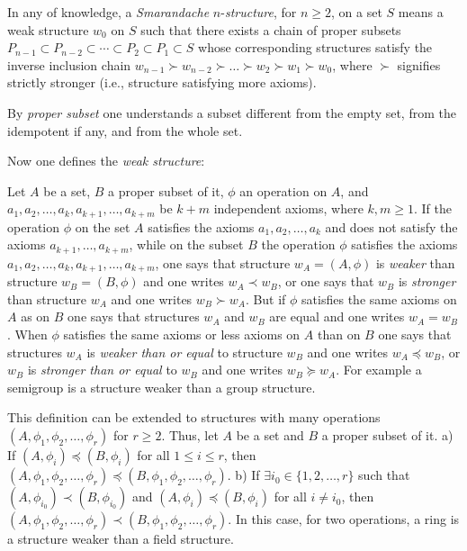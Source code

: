 \documentclass[12pt]{article}
\begin{document}
In any  of knowledge, a \emph{Smarandache} $n$-\emph{structure}, for $n \geqslant 2$, on a set $S$ means a weak structure $w_0$ on $S$ such that there exists a chain of proper subsets $P_{n-1} \subset P_{n-2} \subset \cdots \subset  P_2 \subset P_1 \subset  S$ whose corresponding structures satisfy the inverse inclusion chain $w_{n-1} \succ w_{n-2} \succ \dots \succ w_2 \succ w_1 \succ w_0$, where $\succ$ signifies strictly stronger (i.e., structure satisfying more axioms). 

By \emph{proper subset}  one understands a subset different from the empty set, from the idempotent if any, and from the whole set.

Now one defines the \emph{weak structure}:

Let $A$ be a set, $B$ a proper subset of it, $\phi$ an operation on $A$, and $a_1, a_2, \ldots, a_k, a_{k+1}, \ldots, a_{k+m}$ be $k+m$ independent axioms, where $k, m \geqslant 1$. 
\newline If the operation $\phi$ on the set $A$ satisfies the axioms $a_1, a_2, \ldots, a_k$ and does not satisfy the axioms $a_{k+1}, \ldots, a_{k+m}$, while on the subset $B$  the operation $\phi$ satisfies the axioms $a_1, a_2, \ldots, a_k, a_{k+1}, \ldots, a_{k+m}$, one says that structure $w_A=(A, \phi)$ is \emph{weaker}  than structure $w_B=(B, \phi)$ and one writes $w_A \prec w_B$, or one says that $w_B$ is \emph{stronger}  than structure $w_A$ and one writes $w_B \succ w_A$. 
\newline But if $\phi$ satisfies the same axioms on $A$ as on $B$ one says that structures $w_A$ and $w_B$ are equal and one writes $w_A=w_B$.
\newline When $\phi$ satisfies the same axioms or less axioms on $A$ than on $B$ one says that structures $w_A$ is \emph{weaker than or equal} to structure $w_B$ and one writes $w_A \preceq w_B$, or $w_B$ is \emph{stronger than or equal} to $w_B$ and one writes $w_B \succeq w_A$.
\newline For example a semigroup is a structure weaker than a group structure.

This definition can be extended to structures with many operations $(A, \phi_1, \phi_2, \ldots, \phi_r)$ for $r \geqslant 2$.  Thus, let $A$ be a set and $B$ a proper subset of it.
\newline a) If  $(A, \phi_{i}) \preceq (B, \phi_{i})$ for all $1 \leq i \leq r$, then $(A, \phi_1, \phi_2, \ldots, \phi_r) \preceq (B, \phi_1, \phi_2, \ldots, \phi_r)$.
\newline b) If  $\exists i_0 \in \{1, 2, \ldots, r\}$ such that $(A, \phi_{i_0}) \prec (B, \phi_{i_0})$ and $(A, \phi_i) \preceq (B, \phi_i)$ for all $i \ne i_0$, then $(A, \phi_1, \phi_2, \ldots, \phi_r) \prec (B, \phi_1, \phi_2, \ldots, \phi_r)$.
\newline In this case, for two operations, a ring is a structure weaker than a field structure.
\end{document}
